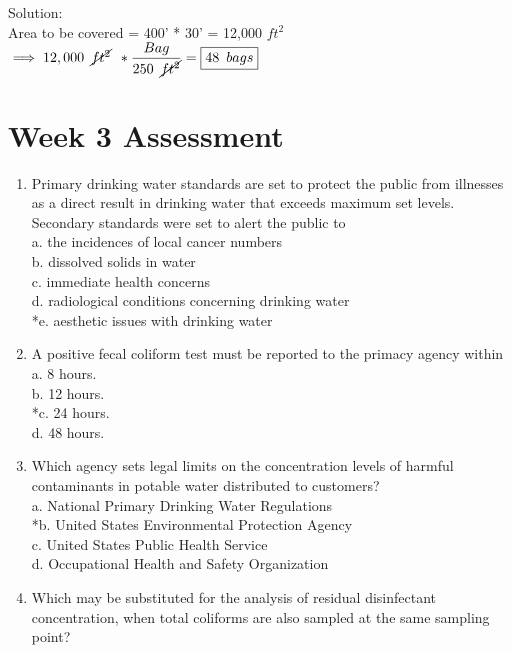 \begin{enumerate}[1.]
\vspace{0.2cm}
Solution:\\
\vspace{0.2cm}
Area to be covered = 400' * 30' = 12,000 $ft^2$
\vspace{0.2cm}
$\implies 12,000 \enspace \cancel{ft^2} \enspace * \dfrac{Bag}{250 \enspace \cancel{ft^2}}=\boxed{48 \enspace bags}$
\end{enumerate}

\newpage

\section{Week 3 Assessment}
\begin{enumerate}[1.]
\item Primary drinking water standards are set to protect the public from illnesses as a direct result in drinking water that exceeds maximum set levels. Secondary standards were set to alert the public to\\
a. the incidences of local cancer numbers\\
b. dissolved solids in water\\
c. immediate health concerns\\
d. radiological conditions concerning drinking water\\
*e. aesthetic issues with drinking water\\
\item A positive fecal coliform test must be reported to the primacy agency within\\
a. 8 hours.\\
b. 12 hours.\\
*c. 24 hours.\\
d. 48 hours.\\
\item Which agency sets legal limits on the concentration levels of harmful contaminants in potable water distributed to customers?\\
a. National Primary Drinking Water Regulations\\
*b. United States Environmental Protection Agency\\
c. United States Public Health Service\\
d. Occupational Health and Safety Organization\\
\item Which may be substituted for the analysis of residual disinfectant concentration, when total coliforms are also sampled at the same sampling point?\\

\end{enumerate}
